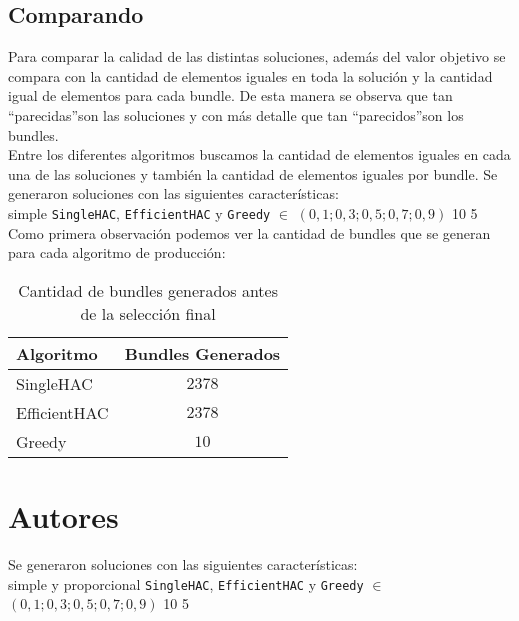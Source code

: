 \subsection{Comparando}
Para comparar la calidad de las distintas soluciones, además del valor objetivo se compara con la cantidad de elementos iguales en toda la solución y la cantidad igual de elementos para cada bundle. De esta manera se observa que tan \textquotedblleft parecidas\textquotedblright son las soluciones y con más detalle que tan \textquotedblleft parecidos\textquotedblright son los bundles.\\ 
Entre los diferentes algoritmos buscamos la cantidad de elementos iguales en cada una de las soluciones y también la cantidad de elementos iguales por bundle. Se generaron soluciones con las siguientes características:\\
\Solucion
{}
{simple}
{\texttt{SingleHAC}, \texttt{EfficientHAC} y \texttt{Greedy}}
{$\in$ $(0,1; 0,3; 0,5; 0,7; 0,9)$}
{10}
{5}
Como primera observación podemos ver la cantidad de bundles que se generan para cada algoritmo de 
producción:\\
\begin{table}[h]
  \centering
  \resizebox{0.5\textwidth}{!} {
    \begin{tabular}{|lc|}
    \hline
    Algoritmo & Bundles Generados \\
    \hline
    SingleHAC & $2378$ \\
    EfficientHAC & $2378$ \\
    Greedy & $10$ \\
    \hline
    \end{tabular}
  }
    \caption {Cantidad de bundles generados antes de la selección final}
\end{table}





\section{Autores}
Se generaron soluciones con las siguientes características:\\
\Solucion
{}
{simple y proporcional}
{\texttt{SingleHAC}, \texttt{EfficientHAC} y \texttt{Greedy}}
{$\in$ $(0,1; 0,3; 0,5; 0,7; 0,9)$}
{10}
{5}

